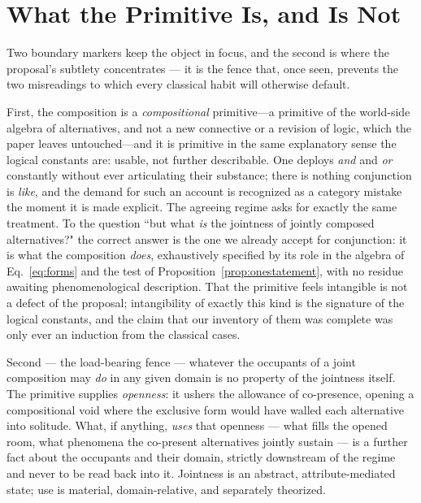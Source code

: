 \documentclass[11pt]{article}
\begin{document}
\section{What the Primitive Is, and Is Not}\label{sec:primitive}
Two boundary markers keep the object in focus, and the second is where the proposal's subtlety concentrates --- it is the fence that, once seen, prevents the two misreadings to which every classical habit will otherwise default.

First, the composition is a \emph{compositional} primitive---a primitive of the world-side algebra of alternatives, and not a new connective or a revision of logic, which the paper leaves untouched---and it is primitive in the same explanatory sense the logical constants are: usable, not further describable. One deploys \emph{and} and \emph{or} constantly without ever articulating their substance; there is nothing conjunction is \emph{like}, and the demand for such an account is recognized as a category mistake the moment it is made explicit. The agreeing regime asks for exactly the same treatment. To the question ``but what \emph{is} the jointness of jointly composed alternatives?" the correct answer is the one we already accept for conjunction: it is what the composition \emph{does}, exhaustively specified by its role in the algebra of Eq.~\eqref{eq:forms} and the test of Proposition~\ref{prop:onestatement}, with no residue awaiting phenomenological description. That the primitive feels intangible is not a defect of the proposal; intangibility of exactly this kind is the signature of the logical constants, and the claim that our inventory of them was complete was only ever an induction from the classical cases.

Second --- the load-bearing fence --- whatever the occupants of a joint composition may \emph{do} in any given domain is no property of the jointness itself. The primitive supplies \emph{openness}: it ushers the allowance of co-presence, opening a compositional void where the exclusive form would have walled each alternative into solitude. What, if anything, \emph{uses} that openness --- what fills the opened room, what phenomena the co-present alternatives jointly sustain --- is a further fact about the occupants and their domain, strictly downstream of the regime and never to be read back into it. Jointness is an abstract, attribute-mediated state; use is material, domain-relative, and separately theorized.
\end{document}
